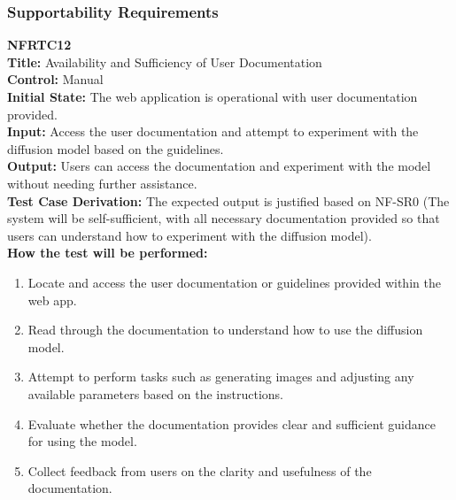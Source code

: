 \documentclass[12pt, titlepage]{article}
\begin{document}
\subsubsection{Supportability Requirements}
\textbf{NFRTC12}\\
\textbf{Title:} Availability and Sufficiency of User Documentation\\
\textbf{Control:} Manual\\
\textbf{Initial State:} The web application is operational with user documentation provided.\\
\textbf{Input:} Access the user documentation and attempt to experiment with the diffusion model based on the guidelines.\\
\textbf{Output:} Users can access the documentation and experiment with the model without needing further assistance.\\
\textbf{Test Case Derivation:} The expected output is justified based on NF-SR0 (The system will be self-sufficient, with all necessary documentation provided so that users can understand how to experiment with the diffusion model).\\
\textbf{How the test will be performed:}
\begin{enumerate}
  \item Locate and access the user documentation or guidelines provided within the web app.
  \item Read through the documentation to understand how to use the diffusion model.
  \item Attempt to perform tasks such as generating images and adjusting any available parameters based on the instructions.
  \item Evaluate whether the documentation provides clear and sufficient guidance for using the model.
  \item Collect feedback from users on the clarity and usefulness of the documentation.
\end{enumerate}
\vspace{1em}
\end{document}
